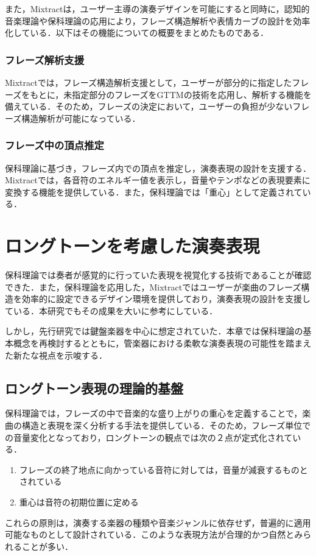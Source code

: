 また，Mixtractは，ユーザー主導の演奏デザインを可能にすると同時に，認知的音楽理論や保科理論の応用により，フレーズ構造解析や表情カーブの設計を効率化している．以下はその機能についての概要をまとめたものである．

\subsubsection{フレーズ解析支援}
Mixtractでは，フレーズ構造解析支援として，ユーザーが部分的に指定したフレーズをもとに，未指定部分のフレーズをGTTMの技術を応用し、解析する機能を備えている．そのため，フレーズの決定において，ユーザーの負担が少ないフレーズ構造解析が可能になっている．
\subsubsection{フレーズ中の頂点推定}
保科理論に基づき，フレーズ内での頂点を推定し，演奏表現の設計を支援する．Mixtractでは，各音符のエネルギー値を表示し，音量やテンポなどの表現要素に変換する機能を提供している．また，保科理論では「重心」として定義されている．

\section{ロングトーンを考慮した演奏表現}
保科理論では奏者が感覚的に行っていた表現を視覚化する技術であることが確認できた．また，保科理論を応用した，Mixtractではユーザーが楽曲のフレーズ構造を効率的に設定できるデザイン環境を提供しており，演奏表現の設計を支援している．本研究でもその成果を大いに参考にしている．

しかし，先行研究では鍵盤楽器を中心に想定されていた．本章では保科理論の基本概念を再検討するとともに，管楽器における柔軟な演奏表現の可能性を踏まえた新たな視点を示唆する．
\subsection{ロングトーン表現の理論的基盤}
保科理論では，フレーズの中で音楽的な盛り上がりの重心を定義することで，楽曲の構造と表現を深く分析する手法を提供している．そのため，フレーズ単位での音量変化となっており，ロングトーンの観点では次の２点が定式化されている．

\begin{enumerate}
	\item フレーズの終了地点に向かっている音符に対しては，音量が減衰するものとされている
	\item 重心は音符の初期位置に定める
\end{enumerate}
これらの原則は，演奏する楽器の種類や音楽ジャンルに依存せず，普遍的に適用可能なものとして設計されている．このような表現方法が合理的かつ自然とみられることが多い．


